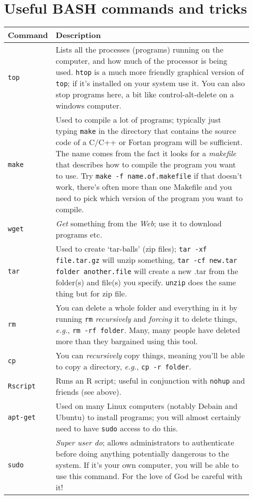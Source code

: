 \documentclass[12pt]{report}
\begin{document}
\section{Useful BASH commands and tricks}
\begin{tabular}{l p{14cm}}\hline
  \textbf{Command} & \textbf{Description}\\\hline
  \texttt{top} & Lists all the processes (programs) running on the computer, and how much of the processor is being used. \texttt{htop} is a much more friendly graphical version of \texttt{top}; if it's installed on your system use it. You can also stop programs here, a bit like control-alt-delete on a windows computer.\\
  \texttt{make} & Used to compile a lot of programs; typically just typing \texttt{make} in the directory that contains the source code of a C/C++ or Fortan program will be sufficient. The name comes from the fact it looks for a \emph{makefile} that describes how to compile the program you want to use. Try \texttt{make -f name.of.makefile} if that doesn't work, there's often more than one Makefile and you need to pick which version of the program you want to compile.\\
  \texttt{wget} & \emph{Get} something from the \emph{Web}; use it to download programs etc.\\
  \texttt{tar} & Used to create `tar-balls' (zip files); \texttt{tar -xf file.tar.gz} will unzip something, \texttt{tar -cf new.tar folder another.file} will create a new .tar from the folder(s) and file(s) you specify. \texttt{unzip} does the same thing but for zip file.\\
  \texttt{rm} & You can delete a whole folder and everything in it by running \texttt{rm} \emph{recursively} and \emph{forcing} it to delete things, \emph{e.g.}, \texttt{rm -rf folder}. Many, many people have deleted more than they bargained using this tool.\\
  \texttt{cp} & You can \emph{recursively} copy things, meaning you'll be able to copy a directory, \emph{e.g.}, \texttt{cp -r folder}.\\
  \texttt{Rscript} & Runs an R script; useful in conjunction with \texttt{nohup} and friends (see above).\\
    \texttt{apt-get} & Used on many Linux computers (notably Debain and Ubuntu) to install programs; you will almost certainly need to have \texttt{sudo} access to do this.\\
  \texttt{sudo} & \emph{Super user do}; allows administrators to authenticate before doing anything potentially dangerous to the system. If it's your own computer, you will be able to use this command. For the love of God be careful with it!\\

\end{tabular}
\end{document}
